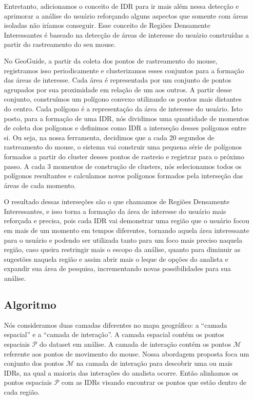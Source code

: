 Entretanto, adicionamos o conceito de IDR para ir mais além nessa detecção e aprimorar a análise do usuário reforçando alguns aspectos que somente com áreas isoladas não iríamos conseguir. Esse conceito de Regiões Densamente Interessantes é baseado na detecção de áreas de interesse do usuário construídas a partir do rastreamento do seu mouse.

No GeoGuide, a partir da coleta dos pontos de rastreamento do mouse, registramos isso periodicamente e clusterizamos esses conjuntos para a formação das áreas de interesse. Cada área é representada por um conjunto de pontos agrupados por sua proximidade em relação de um aos outros. A partir desse conjunto, construímos um polígono convexo utilizando os pontos mais distantes do centro. Cada polígono é a representação da área de interesse do usuário. Isto posto, para a formação de uma IDR, nós dividimos uma quantidade de momentos de coleta dos polígonos e definimos como IDR a interseção desses polígonos entre si. Ou seja, na nossa ferramenta, decidimos que a cada 20 segundos de rastreamento do mouse, o sistema vai construir uma pequena série de polígonos formados a partir do cluster desses pontos de rastreio e registrar para o próximo passo. A cada 3 momentos de construção de clusters, nós selecionamos todos os polígonos resultantes e calculamos novos polígonos formados pela interseção das áreas de cada momento.

O resultado dessas interseções são o que chamamos de Regiões Densamente Interessantes, e isso torna a formação da área de interesse do usuário mais reforçada e precisa, pois cada IDR vai demonstrar uma região que o usuário focou em mais de um momento em tempos diferentes, tornando aquela área interessante para o usuário e podendo ser utilizada tanto para um foco mais preciso naquela região, caso queira restringir mais o escopo da análise, quanto para diminuir as sugestões naquela região e assim abrir mais o leque de opções do analista e expandir sua área de pesquisa, incrementando novas possibilidades para sua análise.

\subsection{Algoritmo}

Nós consideramos duas camadas diferentes no mapa geográfico: a ``camada espacial'' e a ``camada de interação''. A camada espacial contém os pontos espaciais $\mathcal{P}$ do dataset em análise. A camada de interação  contém os pontos $\mathcal{M}$ referente aos pontos de movimento do mouse. Nossa abordagem proposta foca um conjunto dos pontos $\mathcal{M}$ na camada de interação para descobrir uma ou mais IDRs, na qual a maioria das interações do analista ocorre. Então alinhamos os pontos espaciais $\mathcal{P}$ com as IDRs visando encontrar os pontos que estão dentro de cada região. 


